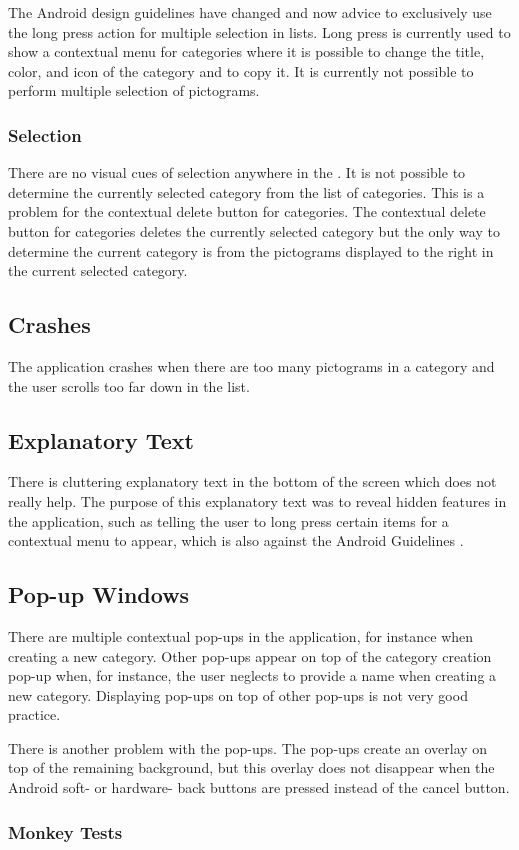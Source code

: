 The Android design guidelines have changed and now advice to exclusively use the long press action for multiple selection in lists. Long press is currently used to show a contextual menu for categories where it is possible to change the title, color, and icon of the category and to copy it. It is currently not possible to perform multiple selection of pictograms. 

\subsubsection{Selection}

There are no visual cues of selection anywhere in the \ct. It is not possible to determine the currently selected category from the list of categories. This is a problem for the contextual delete button for categories. The contextual delete button for categories deletes the currently selected category but the only way to determine the current category is from the pictograms displayed to the right in the current selected category. 

\subsection{Crashes}

The application crashes when there are too many pictograms in a category and the user scrolls too far down in the list. 

\subsection{Explanatory Text}

There is cluttering explanatory text in the bottom of the screen which does not really help. The purpose of this explanatory text was to reveal hidden features in the application, such as telling the user to long press certain items for a contextual menu to appear, which is also against the Android Guidelines \parencite{android_guidelines_longpress}.

\subsection{Pop-up Windows}

There are multiple contextual pop-ups in the application, for instance when creating a new category. Other pop-ups appear on top of the category creation pop-up when, for instance, the user neglects to provide a name when creating a new category. Displaying pop-ups on top of other pop-ups is not very good practice.

There is another problem with the pop-ups. The pop-ups create an overlay on top of the remaining background, but this overlay does not disappear when the Android soft- or hardware- back buttons are pressed instead of the cancel button. 
 
\subsubsection{Monkey Tests}
